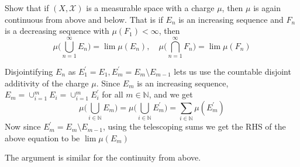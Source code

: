 \begin{exercise}[O]
	Show that if $(X,  \mathcal{X})$ is a measurable space with a charge $\mu$, then $\mu$ is again continuous from above and below. That is if $E_n$ is an increasing sequence and $F_n$ is a decreasing sequence with $\mu(F_1) < \infty$, then $$\mu \Big( \bigcup_{n=1}^\infty E_n \Big)  =  \lim \mu(E_n), \quad \mu \Big( \bigcap_{n=1}^\infty F_n \Big)  =  \lim \mu(F_n)$$
\end{exercise}
\begin{solution}
	Disjointifying $E_n$ as $E_1^\prime = E_1, E_m^\prime = E_m \setminus E_{m-1}$ lets us use the countable disjoint additivity of the charge $\mu$. Since $E_m$ is an increasing sequence, $E_m =\cup_{i=1}^m E_i = \cup_{i=1}^m E_i^\prime$ for all $m \in \mathbb{N}$, and we get $$\mu \Big(\bigcup_{i\in \mathbb{N}} E_m  \Big)  = \mu \Big(\bigcup_{i \in \mathbb{N}} E_m^\prime \Big) = \sum_{i \in \mathbb{N}} \mu(E_m^\prime)$$
	Now since $E_m^\prime = E_m \setminus E_{m-1}$, using the telescoping sums we get the RHS of the above equation to be $\lim \mu(E_m)$

	The argument is similar for the continuity from above.
\end{solution}

